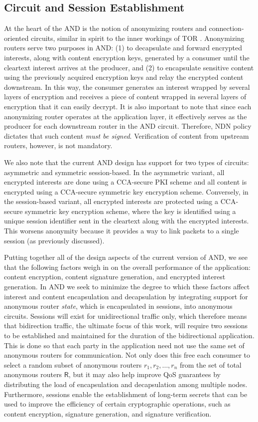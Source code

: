 \subsection{Circuit and Session Establishment}
At the heart of the {\sf AND} is the notion of anonymizing routers and connection-oriented circuits, similar in spirit to the inner workings of TOR \cite{Tor}. Anonymizing routers serve two purposes in {\sf AND}: (1) to decapsulate and forward encrypted interests, along with content encryption keys, generated by a consumer until the cleartext interest arrives at the producer, and (2) to encapsulate sensitive content using the previously acquired encryption keys and relay the encrypted content downstream. In this way, the consumer generates an interest wrapped by several layers of encryption and receives a piece of content wrapped in several layers of encryption that it can easily decrypt. It is also important to note that since each anonymizing router operates at the application layer, it effectively serves as the producer for each downstream router in the {\sf AND} circuit. Therefore, NDN policy dictates that such content \emph{must be signed}. Verification of content from upstream routers, however, is not mandatory. 

We also note that the current {\sf AND} design has support for two types of circuits: asymmetric and symmetric session-based. In the asymmetric variant, all encrypted interests are done using a CCA-secure PKI scheme and all content is encrypted using a CCA-secure symmetric key encryption scheme. Conversely, in the session-based variant, all encrypted interests are protected using a CCA-secure symmetric key encryption scheme, where the key is identified using a unique session identifier sent in the cleartext along with the encrypted interests. This worsens anonymity because it provides a way to link packets to a single session (as previously discussed).

Putting together all of the design aspects of the current version of {\sf AND}, we see that the following factors weigh in on the overall performance of the application: content encryption, content signature generation, and encrypted interest generation. In {\sf AND} we seek to minimize the degree to which these factors affect interest and content encapsulation and decapsulation by integrating support for anonymous router \emph{state}, which is encapsulated in sessions, into anonymous circuits. Sessions will exist for unidirectional traffic only, which therefore means that bidirection traffic, the ultimate focus of this work, will require two sessions to be established and maintained for the duration of the bidirectional application. This is done so that each party in the application need not use the same set of anonymous routers for communication. Not only does this free each consumer to select a random subset of anonymous routers $r_1,r_2,\dots,r_n$ from the set of total anonymous routers $\mathsf{R}$, but it may also help improve QoS guarantees by distributing the load of encapsulation and decapsulation among multiple nodes. Furthermore, sessions enable the establishment of long-term secrets that can be used to improve the efficiency of certain cryptographic operations, such as content encryption, signature generation, and signature verification. 

